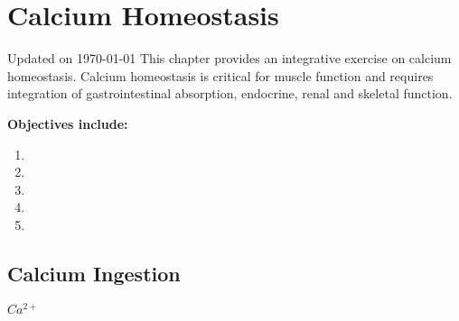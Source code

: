 \chapter{Calcium Homeostasis}\label{chp:calcium_homeostasis}
Updated on \today
\minitoc
This chapter provides an integrative exercise on calcium homeostasis. Calcium homeostasis is critical for muscle function and requires integration of gastrointestinal absorption, endocrine, renal and skeletal function.

\vspace{5mm}

\textbf{Objectives include:}
\begin{enumerate}
    \item
    \item
    \item
    \item
    \item
\end{enumerate}

\section{Calcium Ingestion}

$Ca^{2+}$


\printbibliography[heading=subbibintoc]
